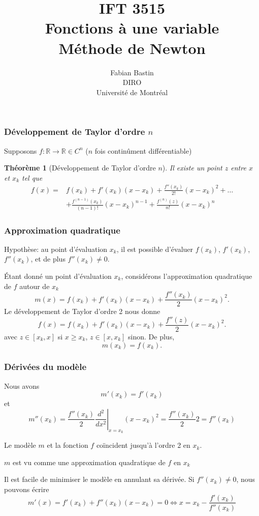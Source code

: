 \documentclass[t,usepdftitle=false]{beamer}
\title[IFT3515]{IFT 3515\\Fonctions à une variable\\Méthode de Newton}
\author[Fabian Bastin]{Fabian Bastin\\DIRO\\Université de Montréal}
\date{}
\newtheorem{thm}{Théorème}
\def\blue{\color{blue}}
\def\cR{\mathbb{R}}
\begin{document}
\frame{\titlepage}


\begin{frame}
\frametitle{Développement de Taylor d'ordre $n$}

Supposons $f: \cR \rightarrow \cR \in C^n$ ($n$ fois continûment différentiable)

\begin{thm}[Développement de Taylor d'ordre $n$]
	
Il existe un point $z$ entre $x$ et $x_k$ tel que
\begin{align*}
f(x) = &f(x_k) + f'(x_k)(x-x_k) + \frac{f''(x_k)}{2!}(x-x_k)^2 + \ldots \\
&+ \frac{f^{(n-1)}(x_k)}{(n-1)!}(x-x_k)^{n-1} + \frac{f^{(n)}(z)}{n!}(x-x_k)^{n}
\end{align*}
\end{thm}

\end{frame}

\begin{frame}
\frametitle{Approximation quadratique}

{\blue Hypothèse}: au point d'évaluation $x_k$, il est possible d'évaluer $f(x_k)$, $f'(x_k)$,
$f''(x_k)$, et de plus $f''(x_k) \ne 0$.

\mbox{}

Étant donné un point d'évaluation $x_k$, considérons l'approximation quadratique de $f$ autour de $x_k$
$$
m(x) = f(x_k) + f'(x_k)(x-x_k)+\frac{f''(x_k)}{2}(x-x_k)^2.
$$
Le développement de Taylor d'ordre 2 nous donne
$$
f(x) = f(x_k) + f'(x_k)(x-x_k)+\frac{f''(z)}{2}(x-x_k)^2.
$$
avec $z \in [x_k, x]$ si $x \geq x_k$, $z \in [x, x_k]$ sinon. De plus,
$$
m(x_k) = f(x_k).
$$
\end{frame}

\begin{frame}
\frametitle{Dérivées du modèle}

Nous avons
\[
m'(x_k) = f'(x_k)
\]
et
$$
m''(x_k) = \frac{f''(x_k)}{2}\left.\frac{d^2}{dx^2}\right|_{x=x_k}(x-x_k)^2
= \frac{f''(x_k)}{2}2 = f''(x_k)
$$

Le modèle $m$ et la fonction $f$ coïncident jusqu'à l'ordre 2 en $x_k$.

\mbox{}

$m$ est vu comme une {\blue approximation quadratique} de $f$ en $x_k$

\mbox{}

Il est facile de minimiser le modèle en annulant sa dérivée.
Si $f''(x_k) \ne 0$, nous pouvons écrire
$$
m'(x) = f'(x_k)+f''(x_k)(x-x_k) = 0 \Leftrightarrow x = x_k - \frac{f'(x_k)}{f''(x_k)}
$$
\end{frame}
\end{document}

